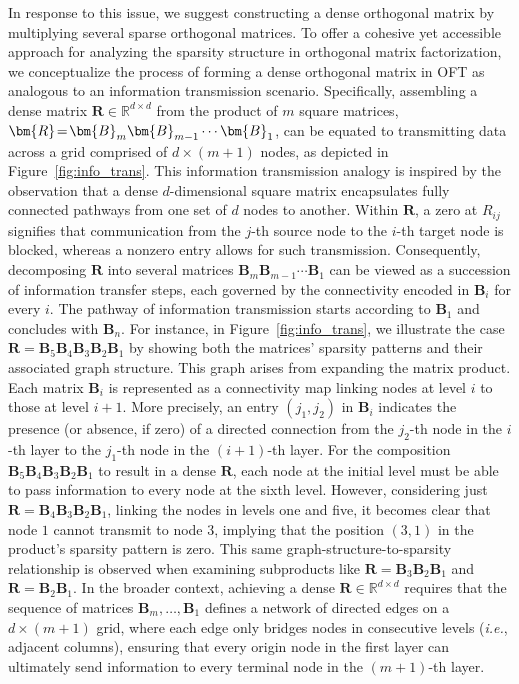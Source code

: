 In response to this issue, we suggest constructing a dense orthogonal matrix by multiplying several sparse orthogonal matrices. To offer a cohesive yet accessible approach for analyzing the sparsity structure in orthogonal matrix factorization, we conceptualize the process of forming a dense orthogonal matrix in OFT as analogous to an information transmission scenario. Specifically, assembling a dense matrix $\bm{R}\in\mathbb{R}^{d\times d}$ from the product of $m$ square matrices, $\thickmuskip=2mu \medmuskip=2mu \bm{R} = \bm{B}_m\bm{B}_{m-1}\cdots\bm{B}_1$, can be equated to transmitting data across a grid comprised of $d\times (m+1)$ nodes, as depicted in Figure~\ref{fig:info_trans}. This information transmission analogy is inspired by the observation that a dense $d$-dimensional square matrix encapsulates fully connected pathways from one set of $d$ nodes to another. Within $\bm{R}$, a zero at $R_{ij}$ signifies that communication from the $j$-th source node to the $i$-th target node is blocked, whereas a nonzero entry allows for such transmission. Consequently, decomposing $\bm{R}$ into several matrices $\bm{B}_m\bm{B}_{m-1}\cdots\bm{B}_1$ can be viewed as a succession of information transfer steps, each governed by the connectivity encoded in $\bm{B}_i$ for every $i$. The pathway of information transmission starts according to $\bm{B}_1$ and concludes with $\bm{B}_n$. For instance, in Figure~\ref{fig:info_trans}, we illustrate the case $\bm{R}=\bm{B}_5\bm{B}_4\bm{B}_3\bm{B}_2\bm{B}_1$ by showing both the matrices’ sparsity patterns and their associated graph structure. This graph arises from expanding the matrix product. Each matrix $\bm{B}_i$ is represented as a connectivity map linking nodes at level $i$ to those at level $i+1$. More precisely, an entry $(j_1, j_2)$ in $\bm{B}_i$ indicates the presence (or absence, if zero) of a directed connection from the $j_2$-th node in the $i$-th layer to the $j_1$-th node in the $(i+1)$-th layer. For the composition $\bm{B}_5\bm{B}_4\bm{B}_3\bm{B}_2\bm{B}_1$ to result in a dense $\bm{R}$, each node at the initial level must be able to pass information to every node at the sixth level. However, considering just $\bm{R}=\bm{B}_4\bm{B}_3\bm{B}_2\bm{B}_1$, linking the nodes in levels one and five, it becomes clear that node $1$ cannot transmit to node $3$, implying that the position $(3,1)$ in the product’s sparsity pattern is zero. This same graph-structure-to-sparsity relationship is observed when examining subproducts like $\bm{R}=\bm{B}_3\bm{B}_2\bm{B}_1$ and $\bm{R}=\bm{B}_2\bm{B}_1$. In the broader context, achieving a dense $\bm{R}\in\mathbb{R}^{d\times d}$ requires that the sequence of matrices $\bm{B}_m, \dots, \bm{B}_1$ defines a network of directed edges on a $d\times(m+1)$ grid, where each edge only bridges nodes in consecutive levels (\emph{i.e.}, adjacent columns), ensuring that every origin node in the first layer can ultimately send information to every terminal node in the $(m+1)$-th layer.

